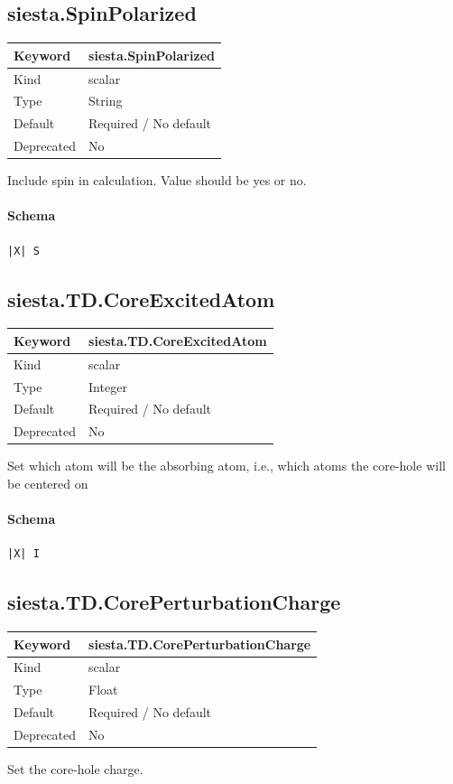 \documentclass[11pt]{article}
\begin{document}
{{{{{\subsection{siesta.SpinPolarized}
\label{kw:siesta-SpinPolarized}
\begin{longtable}{|p{1.5in}|p{4.5in}|}
\hline
Keyword & siesta.SpinPolarized \\
\hline
Kind & scalar \\
\hline
Type & String \\
\hline
Default & Required / No default \\
\hline
Deprecated & No \\
\hline
\end{longtable}
 Include spin in calculation.
 Value should be yes or no.

\paragraph{Schema}
\begin{Verbatim}
|X| S
\end{Verbatim}

\subsection{siesta.TD.CoreExcitedAtom}
\label{kw:siesta-TD-CoreExcitedAtom}
\begin{longtable}{|p{1.5in}|p{4.5in}|}
\hline
Keyword & siesta.TD.CoreExcitedAtom \\
\hline
Kind & scalar \\
\hline
Type & Integer \\
\hline
Default & Required / No default \\
\hline
Deprecated & No \\
\hline
\end{longtable}
 Set which atom will be the absorbing atom, i.e., which atoms the
 core-hole will be centered on

\paragraph{Schema}
\begin{Verbatim}
|X| I
\end{Verbatim}

\subsection{siesta.TD.CorePerturbationCharge}
\label{kw:siesta-TD-CorePerturbationCharge}
\begin{longtable}{|p{1.5in}|p{4.5in}|}
\hline
Keyword & siesta.TD.CorePerturbationCharge \\
\hline
Kind & scalar \\
\hline
Type & Float \\
\hline
Default & Required / No default \\
\hline
Deprecated & No \\
\hline
\end{longtable}
 Set the core-hole charge.

}}}}}
\end{document}
